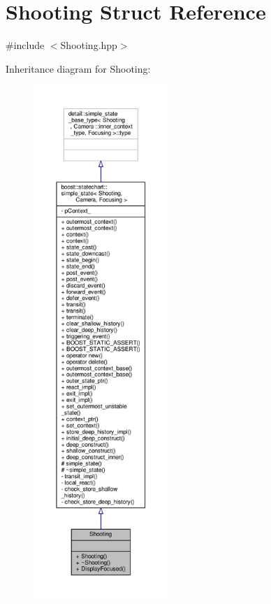 \hypertarget{struct_shooting}{}\section{Shooting Struct Reference}
\label{struct_shooting}


{\ttfamily \#include $<$Shooting.\+hpp$>$}



Inheritance diagram for Shooting\+:
\nopagebreak
\begin{figure}[H]
\begin{center}
\leavevmode
\includegraphics[height=550pt]{struct_shooting__inherit__graph}
\end{center}
\end{figure}



